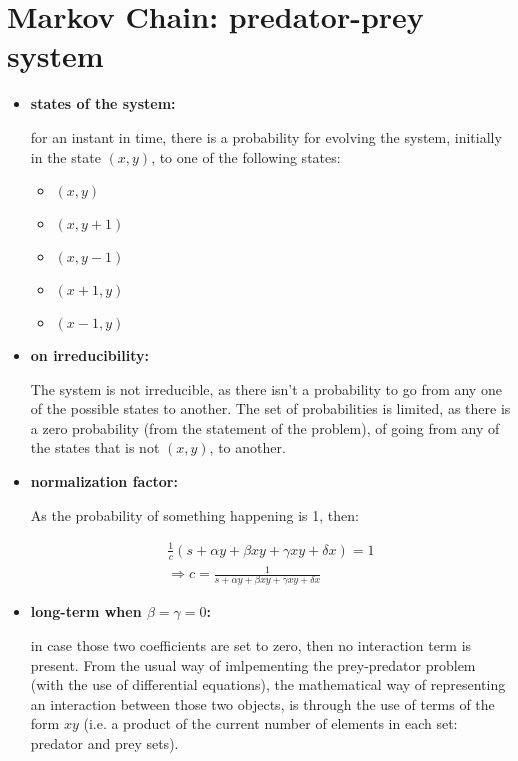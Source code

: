 \documentclass[paper=a4, fontsize=11pt]{scrartcl} %
\numberwithin{equation}{section} %
\numberwithin{figure}{section} %
\numberwithin{table}{section} %
\begin{document}


\section{Markov Chain: predator-prey system}

\begin{itemize}

\item \textbf{states of the system:}

for an instant in time, there is a probability for evolving the system, initially in the state $(x,y)$, to one of the following states:

\begin{itemize}
\item $(x,y)$
\item $(x,y+1)$
\item $(x,y-1)$
\item $(x+1,y)$
\item $(x-1,y)$
\end{itemize}


\item \textbf{on irreducibility:}


The system is not irreducible, as there isn't a probability to go from any one of the possible states to another. The set of probabilities is limited, as there is a zero probability (from the statement of the problem), of going from any of the states that is not $(x,y)$, to another.


\item \textbf{normalization factor:}

As the probability of something happening is 1, then:

\begin{equation}
\begin{split}
\frac{1}{c}(s+\alpha y + \beta xy+ \gamma xy + \delta x) = 1 \\
\Rightarrow c = \frac{1}{s+\alpha y + \beta xy+ \gamma xy + \delta x}
\end{split}
\label{eq:predator_prey9}
\end{equation}


\item \textbf{long-term when $\beta = \gamma = 0$:}


in case those two coefficients are set to zero, then no interaction term is present. From the usual way of imlpementing the prey-predator problem (with the use of differential equations), the mathematical way of representing an interaction between those two objects, is through the use of terms of the form $xy$ (i.e. a product of the current number of elements in each set: predator and prey sets).





\end{itemize}
\end{document}
